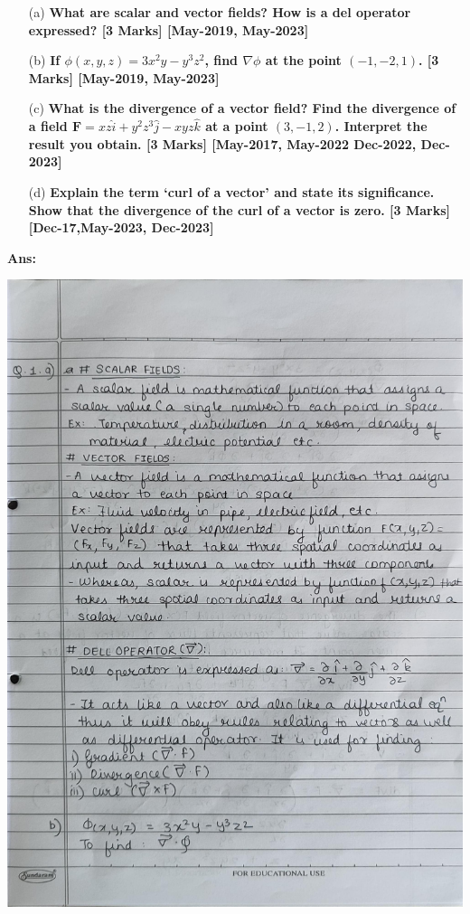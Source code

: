 \documentclass{exam}
\begin{document}
\begin{enumerate}
	
	\item[(a)]  \textbf{What are scalar and vector fields? How is a del operator expressed?   \hfil [3 Marks] [May-2019, May-2023] }
	
	\item[(b)] \textbf{ If $\phi(x,y,z) = 3x^2y - y^3z^2$, find $\nabla \phi$ at the point $(-1, -2, 1)$.  \hfil [3 Marks] [May-2019, May-2023] }
	
	\item[(c)] \textbf{ What is the divergence of a vector field? Find the divergence of a field $\mathbf{F} = xz \hat{i} + y^2 z^3 \hat{j} - xyz \hat{k}$ at a point $(3, -1, 2)$. Interpret the result you obtain.  \hfil [3 Marks] [May-2017, May-2022 Dec-2022, Dec-2023] }
	
	\item[(d)] \textbf{ Explain the term ‘curl of a vector’ and state its significance. Show that the divergence of the curl of a vector is zero.    \hfil [3 Marks] [Dec-17,May-2023, Dec-2023] }
	
\end{enumerate}

\newpage

\textbf{Ans:}
\begin{center}
\includegraphics[scale=0.23]{1.jpeg} 
\end{center}
\end{document}
